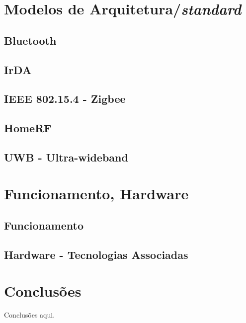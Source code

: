 \documentclass[conference]{IEEEtran}
\begin{document}
\section{Modelos de Arquitetura/\textit{standard}}

\subsection{Bluetooth}

\subsection{IrDA}

\subsection{IEEE 802.15.4 - Zigbee}

\subsection{HomeRF}

\subsection{UWB - Ultra-wideband}


\section{Funcionamento, Hardware}

\subsection{Funcionamento}

\subsection{Hardware - Tecnologias Associadas}




\section{Conclusões}
Conclusões aqui.

{}

\end{document}
